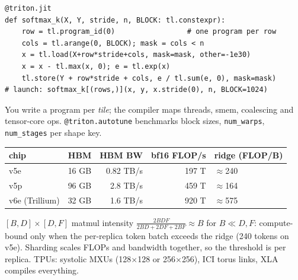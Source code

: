 \begin{qa}
\end{qa}

\begin{mem}
\begin{lstlisting}
@triton.jit
def softmax_k(X, Y, stride, n, BLOCK: tl.constexpr):
    row = tl.program_id(0)                 # one program per row
    cols = tl.arange(0, BLOCK); mask = cols < n
    x = tl.load(X+row*stride+cols, mask=mask, other=-1e30)
    x = x - tl.max(x, 0); e = tl.exp(x)
    tl.store(Y + row*stride + cols, e / tl.sum(e, 0), mask=mask)
# launch: softmax_k[(rows,)](x, y, x.stride(0), n, BLOCK=1024)
\end{lstlisting}
{\scriptsize You write a program per \emph{tile}; the compiler maps threads, smem, coalescing and tensor-core ops. \texttt{@triton.autotune} benchmarks block sizes, \texttt{num\_warps}, \texttt{num\_stages} per shape key.}
\end{mem}

\begin{mem}
\begin{tabularx}{\linewidth}{@{}lrrrL@{}}
\toprule
chip & HBM & HBM BW & bf16 FLOP/s & ridge (FLOP/B)\\\midrule
v5e & 16 GB & 0.82 TB/s & 197 T & $\approx$240\\
v5p & 96 GB & 2.8 TB/s & 459 T & $\approx$164\\
v6e (Trillium) & 32 GB & 1.6 TB/s & 920 T & $\approx$575\\\bottomrule
\end{tabularx}\par\smallskip
{\scriptsize $[B,D]\times[D,F]$ matmul intensity $\frac{2BDF}{2BD+2DF+2BF}\approx B$ for $B\ll D,F$: compute-bound only when the per-replica token batch exceeds the ridge (240 tokens on v5e). Sharding scales FLOPs and bandwidth together, so the threshold is per replica. TPUs: systolic MXUs (128$\times$128 or 256$\times$256), ICI torus links, XLA compiles everything.}
\end{mem}

